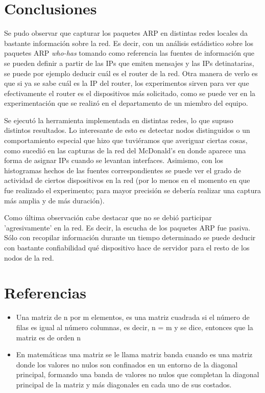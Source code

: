 \section{Conclusiones}

Se pudo observar que capturar los paquetes ARP en distintas redes locales da bastante informaci\'on
sobre la red. Es decir, con un an\'alisis est\'adistico sobre los paquetes ARP \emph{who-has} 
tomando como referencia las fuentes de informaci\'on que se pueden definir a partir de las IPs
que emiten mensajes y las IPs detinatarias, se puede por ejemplo deducir cu\'al es el router de
la red. Otra manera de verlo es que si ya se sabe cu\'al es la IP del router, los experimentos
sirven para ver que efectivamente el router es el dispositivos m\'as solicitado, como se puede
ver en la experimentaci\'on que se realiz\'o en el departamento de un miembro del equipo.

Se ejecut\'o la herramienta implementada en distintas redes, lo que supuso distintos resultados. 
Lo interesante de esto es detectar nodos distinguidos o un comportamiento especial que hizo que
tuvi\'eramos que averiguar ciertas cosas, como sucedi\'o en las capturas de la red del McDonald's
en donde aparece una forma de asignar IPs cuando se levantan interfaces. Asimismo, con los 
histogramas hechos de las fuentes correspondientes se puede ver el grado de actividad de ciertos
dispositivos en la red (por lo menos en el momento en que fue realizado el experimento; para mayor
precisi\'on se deber\'ia realizar una captura m\'as amplia y de m\'as duraci\'on).

Como \'ultima observaci\'on cabe destacar que no se debi\'o participar 'agresivamente' en la red. Es
decir, la escucha de los paquetes ARP fue pasiva. S\'olo con recopilar informaci\'on durante un 
tiempo determinado se puede deducir con bastante confiabilidad qu\'e dispositivo hace de servidor
para el resto de los nodos de la red. 

\newpage

\section{Referencias}\label{sec:MatrizCuadrada}

\begin{itemize}

\item Una matriz de n por m elementos, es una matriz cuadrada si el número de filas es igual al número columnas, es decir, n = m y se dice, entonces que la matriz es de orden n

\item En matemáticas una matriz se le llama matriz banda cuando es una matriz donde los valores no nulos son confinados en un entorno de la diagonal principal, formando una banda de valores no nulos que completan la diagonal principal de la matriz y más diagonales en cada uno de sus costados.

\end{itemize}






